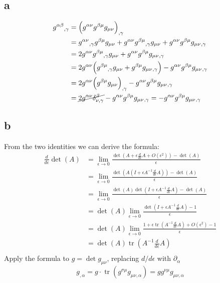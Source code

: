 \documentclass{article}
\DeclareMathOperator{\tr}{tr}
\begin{document}
\subsection*{a}
\begin{align*}
g^{\alpha\beta}{}_{,\gamma} &=\Big( g^{\alpha\nu}g^{\beta\mu}g_{\mu\nu}\Big)_{,\gamma} \\
&= g^{\alpha\nu}{}_{,\gamma}g^{\beta\mu}g_{\mu\nu} + g^{\alpha\nu}g^{\beta\mu}{}_{,\gamma}g_{\mu\nu} + g^{\alpha\nu}g^{\beta\mu}g_{\mu\nu}{}_{,\gamma} \\
&= 2g^{\alpha\nu}g^{\beta\mu}{}_{,\gamma}g_{\mu\nu} + g^{\alpha\nu}g^{\beta\mu}g_{\mu\nu}{}_{,\gamma} \\
&= 2g^{\alpha\nu}\Big( g^{\beta\mu}{}_{,\gamma}g_{\mu\nu} + g^{\beta\mu}g_{\mu\nu}{}_{,\gamma}\Big) - g^{\alpha\nu}g^{\beta\mu}g_{\mu\nu}{}_{,\gamma} \\
&= 2g^{\alpha\nu}\Big(g^{\beta\mu}g_{\mu\nu}\Big)_{,\gamma} - g^{\alpha\nu}g^{\beta\mu}g_{\mu\nu}{}_{,\gamma} \\
&= \cancel{2g^{\alpha\nu}\delta^\beta_{\nu,\gamma}} - g^{\alpha\nu}g^{\beta\mu}g_{\mu\nu}{}_{,\gamma} 
= - g^{\alpha\nu}g^{\beta\mu}g_{\mu\nu}{}_{,\gamma} 
\end{align*}
\subsection*{b}
From the two identities we can derive the formula:
\begin{align*} \frac{d}{d\epsilon}\det(A) &=  \lim_{\epsilon \rightarrow 0} \frac{\det(A + \epsilon \frac{d}{d\epsilon}A + O(\epsilon^2)) - \det(A)}{\epsilon}\\
	&= \lim_{\epsilon \rightarrow 0} \frac{\det(A(I + \epsilon A^{-1}\frac{d}{d\epsilon}A)) - \det(A)}{\epsilon} \\
	&=  \lim_{\epsilon \rightarrow 0} \frac{\det(A)\det(I + \epsilon A^{-1}\frac{d}{d\epsilon}A) - \det(A)}{\epsilon} \\
	&=  \det(A) \lim_{\epsilon \rightarrow 0} \frac{\det(I + \epsilon A^{-1}\frac{d}{d\epsilon}A) - 1}{\epsilon} \\
	&=  \det(A) \lim_{\epsilon \rightarrow 0} \frac{1 + \epsilon \tr(A^{-1}\frac{d}{d\epsilon}A) + O(\epsilon^2) - 1}{\epsilon} \\
	&=  \det(A) \tr(A^{-1}\frac{d}{d\epsilon}A) \\
\end{align*}
Apply the formula to $g = \det g_{\mu\nu}$, replacing $d/d\epsilon$ with $\partial_\alpha$
\[ g_{,\alpha} = g \cdot \tr(g^{\sigma\mu}g_{\mu\nu,\alpha}) = g g^{\nu\mu}g_{\mu\nu,\alpha} \]
\end{document}
